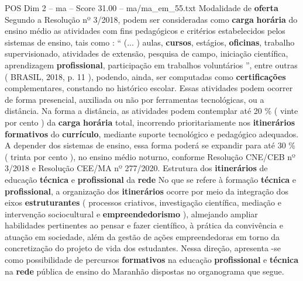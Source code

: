 \begin{textsample}{POS Dim 2 – ma – Score 31.00 – ma/ma\_em\_55.txt}
Modalidade de \textbf{oferta} Segundo a Resolução nº 3/2018, podem ser consideradas como \textbf{carga} \textbf{horária} do ensino médio as atividades com fins pedagógicos e critérios estabelecidos pelos sistemas de ensino, tais como : “ (... ) aulas, \textbf{cursos}, estágios, \textbf{oficinas}, trabalho supervisionado, atividades de extensão, pesquisa de campo, iniciação científica, aprendizagem \textbf{profissional}, participação em trabalhos voluntários ”, entre outras ( BRASIL, 2018, p. 11 ), podendo, ainda, ser computadas como \textbf{certificações} complementares, constando no histórico escolar.
Essas atividades podem ocorrer de forma presencial, auxiliada ou não por ferramentas tecnológicas, ou a distância.
Na forma a distância, as atividades podem contemplar até 20 \% ( vinte por cento ) da \textbf{carga} \textbf{horária} total, incorrendo prioritariamente nos \textbf{itinerários} \textbf{formativos} do \textbf{currículo}, mediante suporte tecnológico e pedagógico adequados.
A depender dos sistemas de ensino, essa forma poderá se expandir para até 30 \% ( trinta por cento ), no ensino médio noturno, conforme Resolução CNE/CEB nº 3/2018 e Resolução CEE/MA nº 277/2020.
Estrutura dos \textbf{itinerários} de educação \textbf{técnica} e \textbf{profissional} da \textbf{rede} No que se refere à formação \textbf{técnica} e \textbf{profissional}, a organização dos \textbf{itinerários} ocorre por meio da integração dos eixos \textbf{estruturantes} ( processos criativos, investigação científica, mediação e intervenção sociocultural e \textbf{empreendedorismo} ), almejando ampliar habilidades pertinentes ao pensar e fazer científico, à prática da convivência e atuação em sociedade, além da gestão de ações empreendedoras em torno da concretização do projeto de vida dos estudantes.
Nessa direção, apresenta -se como possibilidade de percursos \textbf{formativos} na educação \textbf{profissional} e \textbf{técnica} na \textbf{rede} pública de ensino do Maranhão dispostas no organograma que segue.

\end{textsample}

